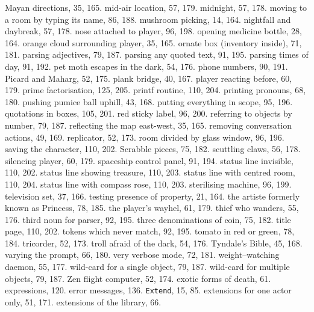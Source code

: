 {{{\quad  Mayan directions, 35, 165.
\quad  mid-air location, 57, 179.
\quad  midnight, 57, 178.
\quad  moving to a room by typing its name, 86, 188.
\quad  mushroom picking, 14, 164.
\quad  nightfall and daybreak, 57, 178.
\quad  nose attached to player, 96, 198.
\quad  opening medicine bottle, 28, 164.
\quad  orange cloud surrounding player, 35, 165.
\quad  ornate box (inventory inside), 71, 181.
\quad  parsing adjectives, 79, 187.
\quad  parsing any quoted text, 91, 195.
\quad  parsing times of day, 91, 192.
\quad  pet moth escapes in the dark, 54, 176.
\quad  phone numbers, 90, 191.
\quad  Picard and Maharg, 52, 175.
\quad  plank bridge, 40, 167.
\quad  player reacting before, 60, 179.
\quad  prime factorisation, 125, 205.
\quad  printf routine, 110, 204.
\quad  printing pronouns, 68, 180.
\quad  pushing pumice ball uphill, 43, 168.
\quad  putting everything in scope, 95, 196.
\quad  quotations in boxes, 105, 201.
\quad  red sticky label, 96, 200.
\quad  referring to objects by number, 79, 187.
\quad  reflecting the map east-west, 35, 165.
\quad  removing conversation actions, 49, 169.
\quad  replicator, 52, 173.
\quad  room divided by glass window, 96, 196.
\quad  saving the character, 110, 202.
\quad  Scrabble pieces, 75, 182.
\quad  scuttling claws, 56, 178.
\quad  silencing player, 60, 179.
\quad  spaceship control panel, 91, 194.
\quad  status line invisible, 110, 202.
\quad  status line showing treasure, 110, 203.
\quad  status line with centred room, 110, 204.
\quad  status line with compass rose, 110, 203.
\quad  sterilising machine, 96, 199.
\quad  television set, 37, 166.
\quad  testing presence of property, 21, 164.
\quad  the artiste formerly known as Princess, 78, 185.
\quad  the player's wayhel, 61, 179.
\quad  thief who wanders, 55, 176.
\quad  third noun for parser, 92, 195.
\quad  three denominations of coin, 75, 182.
\quad  title page, 110, 202.
\quad  tokens which never match, 92, 195.
\quad  tomato in red or green, 78, 184.
\quad  tricorder, 52, 173.
\quad  troll afraid of the dark, 54, 176.
\quad  Tyndale's Bible, 45, 168.
\quad  varying the prompt, 66, 180.
\quad  very verbose mode, 72, 181.
\quad  weight--watching daemon, 55, 177.
\quad  wild-card for a single object, 79, 187.
\quad  wild-card for multiple objects, 79, 187.
\quad  Zen flight computer, 52, 174.
exotic forms of death, 61.
expressions, 120.
\quad  error messages, 136.
{{\tt Extend}}, 15, 85.
extensions for one actor only, 51, 171.
extensions of the library, 66.

}}}

